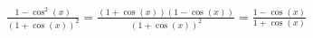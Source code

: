 \documentclass[preview]{standalone}
\begin{document}
\begin{align*}
\frac{1 - \cos^2(x)}{(1 + \cos(x))^2} = \frac{(1 + \cos(x))(1 - \cos(x))}{(1 + \cos(x))^2} = \frac{1 - \cos(x)}{1 + \cos(x)}
\end{align*}
\end{document}

